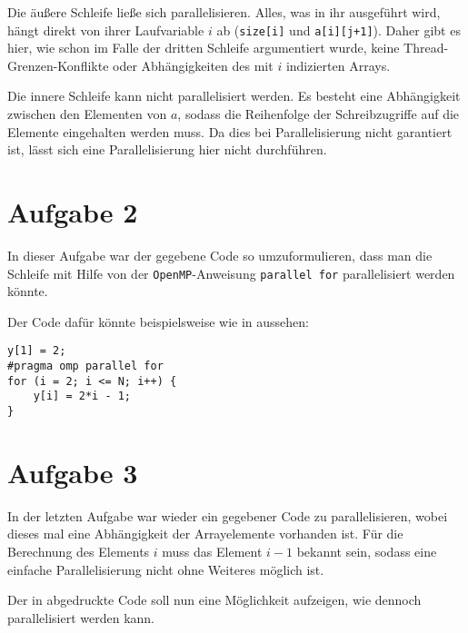 Die äußere Schleife ließe sich parallelisieren. Alles, was in ihr ausgeführt wird,
hängt direkt von ihrer Laufvariable $i$ ab (\texttt{size[i]} und \texttt{a[i][j+1]}).
Daher gibt es hier, wie schon im Falle der dritten Schleife argumentiert wurde, keine
Thread-Grenzen-Konflikte oder Abhängigkeiten des mit $i$ indizierten Arrays.

Die innere Schleife kann nicht parallelisiert werden. Es besteht eine Abhängigkeit
zwischen den Elementen von $a$, sodass die Reihenfolge der Schreibzugriffe auf
die Elemente eingehalten werden muss. Da dies bei Parallelisierung nicht
garantiert ist, lässt sich eine Parallelisierung hier nicht durchführen.

\section*{Aufgabe 2}

In dieser Aufgabe war der gegebene Code so umzuformulieren, dass man die Schleife
mit Hilfe von der \texttt{OpenMP}-Anweisung \texttt{parallel for} parallelisiert
werden könnte.

Der Code dafür könnte beispielsweise wie in  aussehen:

\begin{lstlisting}[caption=Parallelisierte Schleife,label=lst:code2]
y[1] = 2;
#pragma omp parallel for
for (i = 2; i <= N; i++) {
    y[i] = 2*i - 1;
}
\end{lstlisting}

\section*{Aufgabe 3}

In der letzten Aufgabe war wieder ein gegebener Code zu parallelisieren, wobei dieses 
mal eine Abhängigkeit der Arrayelemente vorhanden ist. Für die Berechnung des Elements
$i$ muss das Element $i-1$ bekannt sein, sodass eine einfache Parallelisierung nicht
ohne Weiteres möglich ist.

Der in  abgedruckte Code soll nun eine Möglichkeit aufzeigen,
wie  dennoch parallelisiert werden kann.

